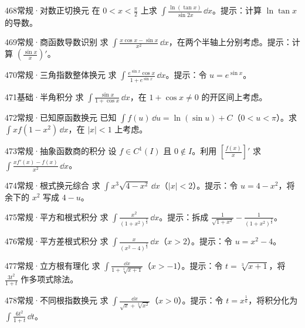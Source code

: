\begin{exercise}{468}{常规·对数正切换元}
在 $0<x<\frac{\pi}{2}$ 上求 $\int\frac{\ln(\tan x)}{\sin2x}\,\dd x$。提示：计算 $\ln\tan x$ 的导数。
\end{exercise}
\begin{exercise}{469}{常规·商函数导数识别}
求 $\int\frac{x\cos x-\sin x}{x^2}\,\dd x$，在两个半轴上分别考虑。提示：计算 $(\frac{\sin x}{x})'$。
\end{exercise}
\begin{exercise}{470}{常规·三角指数整体换元}
求 $\int\frac{e^{\sin x}\cos x}{1+e^{\sin x}}\,\dd x$。提示：令 $u=e^{\sin x}$。
\end{exercise}
\begin{exercise}{471}{基础·半角积分}
求 $\int\frac{\sin x}{1+\cos x}\,\dd x$，在 $1+\cos x\ne0$ 的开区间上考虑。
\end{exercise}
\begin{exercise}{472}{常规·已知原函数换元}
已知 $\int f(u)\,\dd u=\ln(\sin u)+C$（$0<u<\pi$）。求 $\int xf(1-x^2)\,\dd x$，在 $|x|<1$ 上考虑。
\end{exercise}
\begin{exercise}{473}{常规·抽象函数商的积分}
设 $f\in C^1(I)$ 且 $0\notin I$。利用 $[\frac{f(x)}{x}]'$ 求 $\int\frac{xf'(x)-f(x)}{x^2}\,\dd x$。
\end{exercise}
\begin{exercise}{474}{常规·根式换元综合}
求 $\int x^3\sqrt{4-x^2}\,\dd x$（$|x|<2$）。提示：令 $u=4-x^2$，将余下的 $x^2$ 写成 $4-u$。
\end{exercise}
\begin{exercise}{475}{常规·平方和根式积分}
求 $\int\frac{x^2}{(1+x^2)^{\frac{3}{2}}}\,\dd x$。提示：拆成 $\frac{1}{\sqrt{1+x^2}}-\frac{1}{(1+x^2)^{\frac{3}{2}}}$。
\end{exercise}
\begin{exercise}{476}{常规·平方差根式积分}
求 $\int\frac{x}{(x^2-4)^{\frac{3}{2}}}\,\dd x$（$x>2$）。提示：令 $u=x^2-4$。
\end{exercise}
\begin{exercise}{477}{常规·立方根有理化}
求 $\int\frac{\dd x}{1+\sqrt[3]{x+1}}$（$x>-1$）。提示：令 $t=\sqrt[3]{x+1}$，将 $\frac{3t^2}{1+t}$ 作多项式除法。
\end{exercise}
\begin{exercise}{478}{常规·不同根指数换元}
求 $\int\frac{\dd x}{\sqrt x+\sqrt[3]{x^2}}$（$x>0$）。提示：令 $t=x^{\frac{1}{6}}$，将积分化为 $\int\frac{6t^2}{1+t}\,\dd t$。
\end{exercise}
